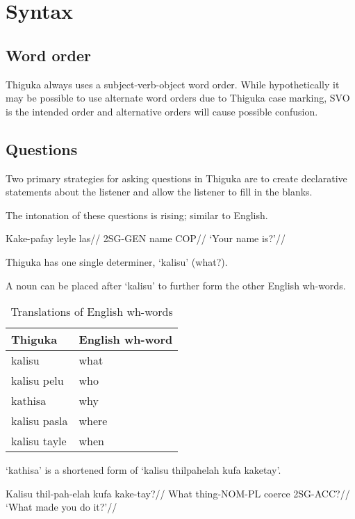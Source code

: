 \newpage

\section{Syntax}
\subsection{Word order}
Thiguka always uses a subject-verb-object word order.
While hypothetically it may be possible to use alternate word orders due to Thiguka case marking, SVO is the intended order and alternative orders will cause possible confusion.

\subsection{Questions}
Two primary strategies for asking questions in Thiguka are to create declarative statements about the listener and allow the listener to fill in the blanks.

The intonation of these questions is rising; similar to English.

\ex
\begingl
    \gla  Kake-pafay leyle las//
    \glb  2SG-GEN name COP//
    \glft `Your name is?'//
\endgl
\xe


Thiguka has one single determiner, `kalisu' (what?).

A noun can be placed after `kalisu' to further form the other English wh-words.

\begin{table}[h!]
    \centering
    \caption{Translations of English wh-words}
    \begin{tabularx}{8cm}{|X|X|}
        \hline
        \textbf{Thiguka} & \textbf{English wh-word} \\
        \hline
        kalisu & what \\
        kalisu pelu & who \\
        kathisa & why \\
        kalisu pasla & where \\
        kalisu tayle & when \\
        \hline
    \end{tabularx}
\end{table}

`kathisa' is a shortened form of `kalisu thilpahelah kufa kaketay'.

\ex
\begingl
    \gla  Kalisu thil-pah-elah kufa kake-tay?//
    \glb  What thing-NOM-PL coerce 2SG-ACC?//
    \glft `What made you do it?'//
\endgl
\xe


